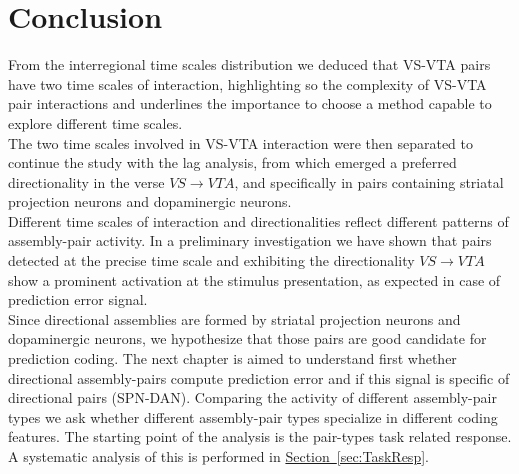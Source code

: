 \section{Conclusion}
From the interregional time scales distribution we deduced that VS-VTA pairs have two time scales of interaction, highlighting so the complexity of VS-VTA pair interactions and underlines the importance to choose a method capable to explore different time scales.\\The two time scales involved in VS-VTA interaction were then separated to continue the study with the lag analysis, from which emerged a preferred directionality in the verse $VS\rightarrow VTA$, and specifically in pairs containing striatal projection neurons and dopaminergic neurons.\\Different time scales of interaction and directionalities reflect different patterns of assembly-pair activity. In a preliminary investigation we have shown that pairs detected at the precise time scale and exhibiting the directionality $VS\rightarrow VTA$ show a prominent activation at the stimulus presentation, as expected in case of prediction error signal.\\Since directional assemblies are formed by striatal projection neurons and dopaminergic neurons, we hypothesize that those pairs are good candidate for prediction coding. The next chapter is aimed to understand first whether directional assembly-pairs compute prediction error and if this signal is specific of directional pairs (SPN-DAN). Comparing the activity of different assembly-pair types we ask whether different assembly-pair types specialize in different coding features. The starting point of the analysis is the pair-types task related response. A systematic analysis of this is performed in \hyperref[sec:TaskResp]{Section~\ref*{sec:TaskResp}}.


